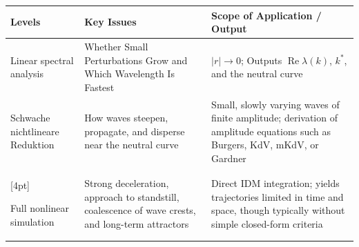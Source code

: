\documentclass[11pt,a4paper,openany]{book}
\numberwithin{equation}{chapter}
\numberwithin{figure}{chapter}
\numberwithin{table}{chapter}
\begin{document}
\begin{center}
\small
{}
\label{tab:nonlinear-levels}
\begin{tabular}{p{3.1cm}p{5.2cm}p{5.4cm}}
\toprule
\textbf{Levels} & \textbf{Key Issues} & \textbf{Scope of Application / Output} \\
\midrule







Linear spectral analysis




&




 Whether Small Perturbations Grow and Which Wavelength Is Fastest




&




 $|r|\to0$; Outputs $\operatorname{Re}\lambda(k)$, $k^*$, and the neutral curve\\[4pt]

Schwache nichtlineare Reduktion




&






How waves steepen, propagate, and disperse near the neutral curve






&






Small, slowly varying waves of finite amplitude; derivation of amplitude equations such as Burgers, KdV, mKdV, or Gardner





\\

[4pt]

Full nonlinear simulation






&






Strong deceleration, approach to standstill, coalescence of wave crests, and long-term attractors






&






Direct IDM integration; yields trajectories limited in time and space, though typically without simple closed-form criteria






\\
\bottomrule
\end{tabular}
\end{center}
\end{document}
